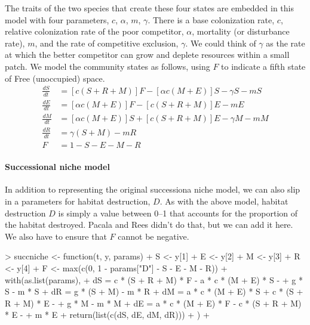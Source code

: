 The traits of the two species that create these four states are embedded in this model with four parameters, $c$, $\alpha$, $m$, $\gamma$. There is a base colonization rate, $c$, relative colonization rate of the poor competitor, $\alpha$, mortality (or disturbance rate), $m$, and the rate of competitive exclusion, $\gamma$. We could think of $\gamma$ as the rate at which the better competitor can grow and deplete resources within a small patch. We model the community states as follows, using $F$ to indicate a fifth state of Free (unoccupied) space.
\begin{align}
  \label{eq:sn1}
  \frac{dS}{dt}& = \left[ c\left(S+R+M\right)\right]F - \left[\alpha c\left(M+E\right)\right]S - \gamma S - mS\\
 \frac{dE}{dt}& = \left[\alpha c\left(M+E\right)\right]F - \left[ c\left(S+R+M\right)\right]E - mE\\
 \frac{dM}{dt}& = \left[\alpha c\left(M+E\right)\right]S + \left[ c\left(S+R+M\right)\right]E - \gamma M - mM\\
 \frac{dR}{dt}& = \gamma\left( S + M\right) - mR\\
          F&= 1-S-E-M-R
\end{align}


\medskip \noindent
\begin{boxedminipage}{\linewidth}
  {\footnotesize
\paragraph{Successional niche model} 
In addition to representing the original successiona niche model, we can also slip in a parameters for habitat destruction, $D$. As with the above model, habitat destruction $D$ is simply a value between 0--1 that accounts for the proportion of the habitat destroyed. Pacala and Rees \cite{Pacala1998} didn't do that, but we can add it here. We also have to ensure that $F$ cannot be negative.
\begin{Schunk}
\begin{Sinput}
> succniche <- function(t, y, params) {
+     S <- y[1]
+     E <- y[2]
+     M <- y[3]
+     R <- y[4]
+     F <- max(c(0, 1 - params["D"] - S - E - M - R))
+     with(as.list(params), {
+         dS = c * (S + R + M) * F - a * c * (M + E) * S - 
+             g * S - m * S
+         dR = g * (S + M) - m * R
+         dM = a * c * (M + E) * S + c * (S + R + M) * E - 
+             g * M - m * M
+         dE = a * c * (M + E) * F - c * (S + R + M) * E - 
+             m * E
+         return(list(c(dS, dE, dM, dR)))
+     })
+ }
\end{Sinput}
\end{Schunk}

}
\end{boxedminipage} \medskip


